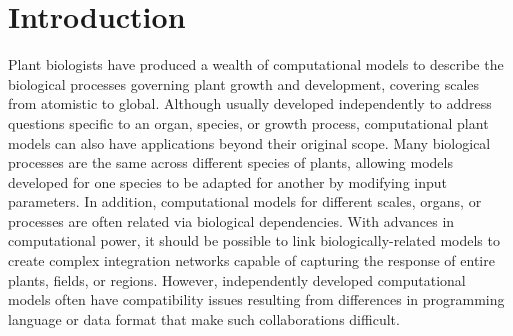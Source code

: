 \documentclass[journal]{IEEEtran}
\begin{document}
\section{Introduction}\label{S:intro}
%
Plant biologists have produced a wealth of computational models to describe the biological processes governing plant growth and development, covering scales from atomistic to global. Although usually developed independently to address questions specific to an organ, species, or growth process, computational plant models can also have applications beyond their original scope. Many biological processes are the same across different species of plants, allowing models developed for one species to be adapted for another by modifying input parameters. In addition, computational models for different scales, organs, or processes are often related via biological dependencies. %
With advances in computational power, it should be possible to link biologically-related models to create complex integration networks capable of capturing the response of entire plants, fields, or regions. However, independently developed computational models often have compatibility issues resulting from differences in programming language or data format that make such collaborations difficult. 
\end{document}
